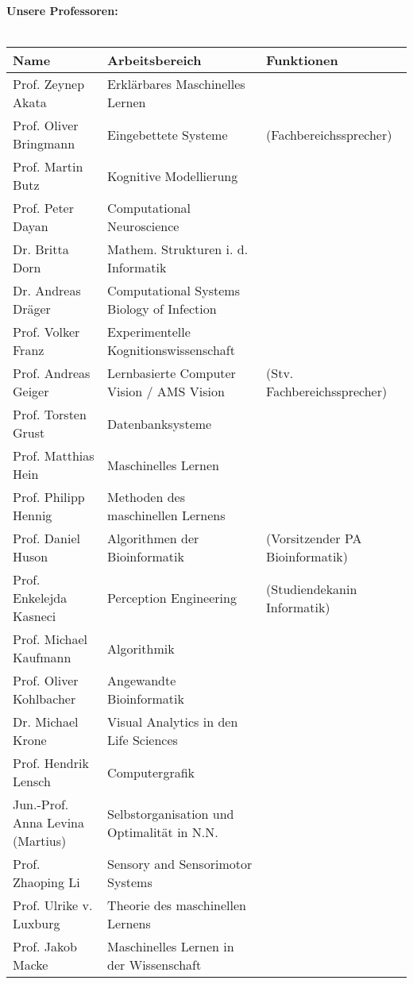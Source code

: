 \renewcommand{\arraystretch}{1}
\scriptsize
\textbf{Unsere Professoren:}\\\\
\begin{tabular}{|lll|}
\hline
Name                          & Arbeitsbereich & Funktionen \\
\hline
\hline
Prof. Zeynep Akata            & Erklärbares Maschinelles Lernen &\\
Prof. Oliver Bringmann        & Eingebettete Systeme & (Fachbereichssprecher)\\
Prof. Martin Butz             & Kognitive Modellierung 	&	\\
Prof. Peter Dayan             & Computational Neuroscience &\\
Dr. Britta Dorn               & Mathem. Strukturen i. d. Informatik &\\
Dr. Andreas Dräger			  & Computational Systems Biology of Infection &\\
Prof. Volker Franz			  & Experimentelle Kognitionswissenschaft &\\ 
    Prof. Andreas Geiger          &  Lernbasierte Computer Vision / AMS Vision & (Stv. Fachbereichssprecher) \\
Prof. Torsten Grust	          & Datenbanksysteme			& \\
Prof. Matthias Hein  		  & Maschinelles Lernen & \\
Prof. Philipp Hennig		  & Methoden des maschinellen Lernens & \\
Prof. Daniel Huson            & Algorithmen der Bioinformatik & (Vorsitzender PA Bioinformatik) \\
Prof. Enkelejda Kasneci		  & Perception Engineering & (Studiendekanin Informatik\footnotemark)\\
Prof. Michael Kaufmann        & Algorithmik		&	\\
Prof. Oliver Kohlbacher       & Angewandte Bioinformatik &\\
Dr. Michael Krone 			  & Visual Analytics in den Life Sciences & \\
Prof. Hendrik Lensch          & Computergrafik	&\\ 
Jun.-Prof. Anna Levina (Martius) & Selbstorganisation und Optimalität in N.N. & \\
Prof. Zhaoping Li			  & Sensory and Sensorimotor Systems &\\
Prof. Ulrike v. Luxburg		  & Theorie des maschinellen Lernens & \\
Prof. Jakob Macke             & Maschinelles Lernen in der Wissenschaft &\\

\end{tabular}
